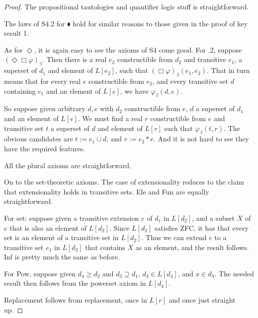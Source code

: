 \documentclass{article}
\newcommand\D{\blacklozenge}
\begin{document}
    \begin{proof}
        The propositional tautologies and quantifier logic stuff is straightforward.
    
        The laws of S4.2 for $\D$ hold for similar reasons to those given 
        in the proof of key result 1. 

        As for $\Diamond$, it is again easy to see the axioms of S4 come good.
        For $.2$, suppose 
        $(\Diamond \Box \varphi)_\exists$. Then there is a real $e_2$ constructible from
        $d_2$ and transitive $e_1$, a superset of $d_1$ and element of $L[e_2]$,
        such that $ (\Box \varphi)_\exists(e_1, e_2)$.
        That in turn means that for every real $e$ constructible from $e_2$, and 
        every transitive 
        set $d$ containing $e_1$ and an element of $L[e]$, we have 
        $\varphi_\exists(d, e)$.

        So suppose given arbitrary $d, e$ with $d_2$ constructible from $e$, 
        $d$ a superset of $d_1$ and an element of $L[e]$. We must find a real $r$ 
        constructible from $e$ and transitive set $t$ a superset of $d$ and element 
        of $L[r]$ such that $\varphi_\exists(t, r)$. The obvious candidates are 
        $t:= e_1 \cup d$, and $r := e_2*e$. And it is not hard to see they 
        have the required features.

        All the plural axioms are straightforward.
    
        On to the set-theoretic axioms. The case of extensionality reduces to the claim 
        that extensionality holds in transitive sets. Ele and Fun are equally straightforward.
        
        For set: suppose given a transitive extension $e$ of $d_1$ in $L[d_2]$,
        and a subset $X$ of $e$ that is also an element of $L[d_2]$. Since $L[d_2]$
        satisfies ZFC, it has that 
        every set is an element of a transitive set in $L[d_2]$.
        Thus we can extend $e$ to a transitive 
        set $e_1$ in $L[d_2]$ that contains $X$ as an element, and the result follows. 
        Inf is pretty much the same as before.
        
        For Pow, suppose given $d_4 \geq d_2$ and $d_3 \supseteq d_1$, $d_3 \in L[d_4]$,
        and $x \in d_3$. The needed result then follows from the powerset axiom in 
        $L[d_4]$.

        Replacement follows from replacement, once in $L[r]$ and once just straight up.
    \end{proof}
\end{document}
